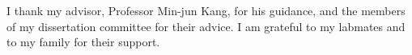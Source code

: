 I thank my advisor, Professor Min-jun Kang, for his guidance, and the members of my dissertation
committee for their advice. I am grateful to my labmates and to my family for their support.
